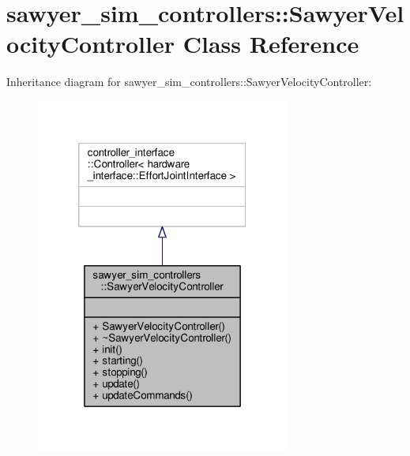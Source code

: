 \hypertarget{classsawyer__sim__controllers_1_1_sawyer_velocity_controller}{\section{sawyer\-\_\-sim\-\_\-controllers\-:\-:Sawyer\-Velocity\-Controller Class Reference}
\label{classsawyer__sim__controllers_1_1_sawyer_velocity_controller}
}


Inheritance diagram for sawyer\-\_\-sim\-\_\-controllers\-:\-:Sawyer\-Velocity\-Controller\-:
\nopagebreak
\begin{figure}[H]
\begin{center}
\leavevmode
\includegraphics[width=236pt]{classsawyer__sim__controllers_1_1_sawyer_velocity_controller__inherit__graph}
\end{center}
\end{figure}


